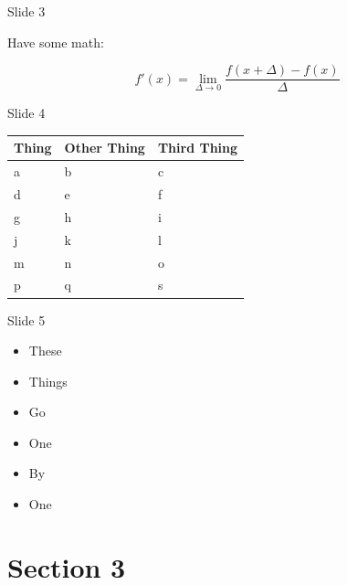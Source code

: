 \documentclass{beamer}
\begin{document}
\begin{frame}{Slide 3}\begin{center}
Have some math:

{\Large \[
f'(x) = \mathop {\lim }\limits_{\Delta \to 0} \frac{{f\left( {x + \Delta } \right) - f\left( x \right)}}{\Delta }
\]
}
\end{center}\end{frame}


\begin{frame}{Slide 4}\begin{center}
\begin{tabular}{|l|l|l|}
\hline
{\bf Thing} & {\bf Other Thing} & {\bf Third Thing} \\
\hline
a & b & c\\
d & e & f \\
g & h & i \\
j & k & l \\
m & n & o \\
p & q & s \\
\hline
\end{tabular}
\end{center}\end{frame}

\begin{frame}{Slide 5}\begin{center}
\begin{itemize}
\item These
\pause
\item Things
\pause
\item Go
\pause
\item One
\pause
\item By
\pause
\item One
\end{itemize}
\end{center}\end{frame}


\section{Section 3}
\subsection{}
\end{document}
